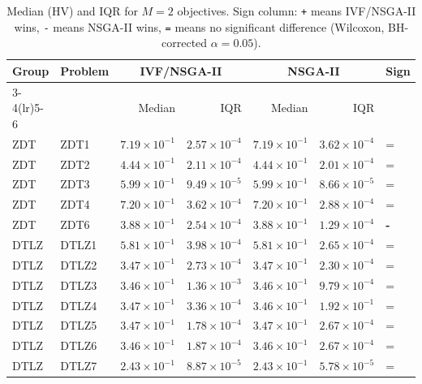 \begin{table}[t]
\centering
\caption{Median (HV) and IQR for $M=2$ objectives. Sign column: \texttt{+} means IVF/NSGA-II wins, \texttt{-} means NSGA-II wins, \texttt{=} means no significant difference (Wilcoxon, BH-corrected $\alpha=0.05$).}
\label{tab:hv_m2_ivfnsgaii}
\scriptsize
\begin{tabular}{llrrrrl}
\toprule
Group & Problem & \multicolumn{2}{c}{IVF/NSGA-II} & \multicolumn{2}{c}{NSGA-II} & Sign \\
\cmidrule(lr){3-4}\cmidrule(lr){5-6}
 & & Median & IQR & Median & IQR & \\
\midrule
ZDT & ZDT1 & $7.19\!\times\!10^{-1}$ & $2.57\!\times\!10^{-4}$ & $7.19\!\times\!10^{-1}$ & $3.62\!\times\!10^{-4}$ & = \\
ZDT & ZDT2 & $4.44\!\times\!10^{-1}$ & $2.11\!\times\!10^{-4}$ & $4.44\!\times\!10^{-1}$ & $2.01\!\times\!10^{-4}$ & = \\
ZDT & ZDT3 & $5.99\!\times\!10^{-1}$ & $9.49\!\times\!10^{-5}$ & $5.99\!\times\!10^{-1}$ & $8.66\!\times\!10^{-5}$ & = \\
ZDT & ZDT4 & $7.20\!\times\!10^{-1}$ & $3.62\!\times\!10^{-4}$ & $7.20\!\times\!10^{-1}$ & $2.88\!\times\!10^{-4}$ & = \\
ZDT & ZDT6 & $3.88\!\times\!10^{-1}$ & $2.54\!\times\!10^{-4}$ & $3.88\!\times\!10^{-1}$ & $1.29\!\times\!10^{-4}$ & \textbf{-} \\
\addlinespace
DTLZ & DTLZ1 & $5.81\!\times\!10^{-1}$ & $3.98\!\times\!10^{-4}$ & $5.81\!\times\!10^{-1}$ & $2.65\!\times\!10^{-4}$ & = \\
DTLZ & DTLZ2 & $3.47\!\times\!10^{-1}$ & $2.73\!\times\!10^{-4}$ & $3.47\!\times\!10^{-1}$ & $2.30\!\times\!10^{-4}$ & = \\
DTLZ & DTLZ3 & $3.46\!\times\!10^{-1}$ & $1.36\!\times\!10^{-3}$ & $3.46\!\times\!10^{-1}$ & $9.79\!\times\!10^{-4}$ & = \\
DTLZ & DTLZ4 & $3.47\!\times\!10^{-1}$ & $3.36\!\times\!10^{-4}$ & $3.46\!\times\!10^{-1}$ & $1.92\!\times\!10^{-1}$ & = \\
DTLZ & DTLZ5 & $3.47\!\times\!10^{-1}$ & $1.78\!\times\!10^{-4}$ & $3.47\!\times\!10^{-1}$ & $2.67\!\times\!10^{-4}$ & = \\
DTLZ & DTLZ6 & $3.46\!\times\!10^{-1}$ & $1.87\!\times\!10^{-4}$ & $3.46\!\times\!10^{-1}$ & $2.67\!\times\!10^{-4}$ & = \\
DTLZ & DTLZ7 & $2.43\!\times\!10^{-1}$ & $8.87\!\times\!10^{-5}$ & $2.43\!\times\!10^{-1}$ & $5.78\!\times\!10^{-5}$ & = \\

\end{tabular}
\end{table}

